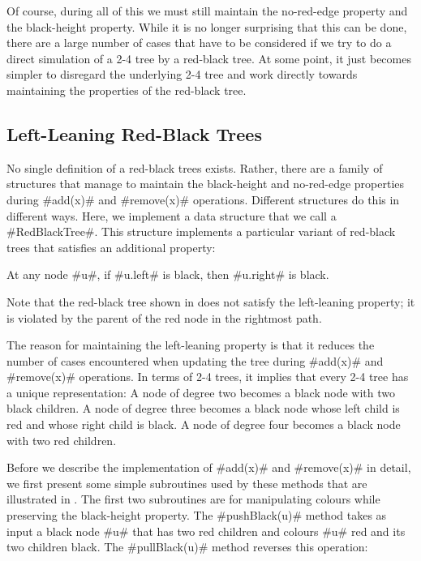 Of course, during all of this we must still maintain the no-red-edge
property and the black-height property.  While it is no longer surprising
that this can be done, there are a large number of cases that have to
be considered if we try to do a direct simulation of a 2-4 tree by a
red-black tree.  At some point, it just becomes simpler to disregard the
underlying 2-4 tree and work directly towards maintaining the properties
of the red-black tree.

\subsection{Left-Leaning Red-Black Trees}

No single definition of a red-black trees exists.  Rather, there are
a family of structures that manage to maintain the black-height
and no-red-edge properties during #add(x)# and #remove(x)#
operations. Different structures do this in different ways.
Here, we implement a data structure that we call a #RedBlackTree#.
This structure implements a particular variant of red-black trees that
satisfies an additional property:
\begin{prp}
  At any node #u#, if #u.left# is black, then #u.right# is black.
\end{prp}
Note that the red-black tree shown in   does
not satisfy the left-leaning property;  it is violated by the parent of
the red node in the rightmost path.

The reason for maintaining the left-leaning property is that it reduces
the number of cases encountered when updating the tree during #add(x)#
and #remove(x)# operations.  In terms of 2-4 trees, it implies that every
2-4 tree has a unique representation:  A node of degree two becomes
a black node with two black children.  A node of degree three becomes
a black node whose left child is red and whose right child is black.
A node of degree four becomes a black node with two red children.

Before we describe the implementation of #add(x)# and #remove(x)# in
detail, we first present some simple subroutines used by these methods
that are illustrated in .  The first two
subroutines are for manipulating colours while preserving the black-height
property. The #pushBlack(u)# method takes as input a black node #u#
that has two red children and colours #u# red and its two children black.
The #pullBlack(u)# method reverses this operation:

